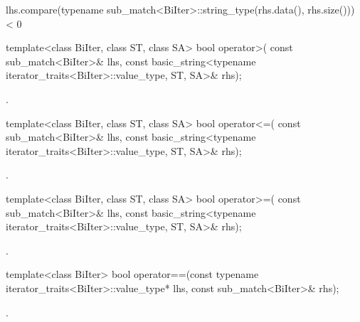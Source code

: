 \begin{itemdescr}
\pnum
\returns
\begin{codeblock}
lhs.compare(typename sub_match<BiIter>::string_type(rhs.data(), rhs.size())) < 0
\end{codeblock}
\end{itemdescr}

%
\begin{itemdecl}
template<class BiIter, class ST, class SA>
  bool operator>(
      const sub_match<BiIter>& lhs,
      const basic_string<typename iterator_traits<BiIter>::value_type, ST, SA>& rhs);
\end{itemdecl}

\begin{itemdescr}
\pnum\returns {}.
\end{itemdescr}

%
\begin{itemdecl}
template<class BiIter, class ST, class SA>
  bool operator<=(
      const sub_match<BiIter>& lhs,
      const basic_string<typename iterator_traits<BiIter>::value_type, ST, SA>& rhs);
\end{itemdecl}

\begin{itemdescr}
\pnum\returns {}.
\end{itemdescr}

%
\begin{itemdecl}
template<class BiIter, class ST, class SA>
  bool operator>=(
      const sub_match<BiIter>& lhs,
      const basic_string<typename iterator_traits<BiIter>::value_type, ST, SA>& rhs);
\end{itemdecl}

\begin{itemdescr}
\pnum\returns {}.
\end{itemdescr}

%
\begin{itemdecl}
template<class BiIter>
  bool operator==(const typename iterator_traits<BiIter>::value_type* lhs,
                  const sub_match<BiIter>& rhs);
\end{itemdecl}

\begin{itemdescr}
\pnum\returns {}.
\end{itemdescr}

